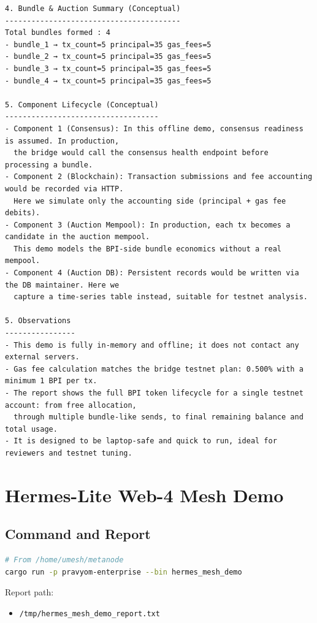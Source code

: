\begin{lstlisting}[language=text]
4. Bundle & Auction Summary (Conceptual)
----------------------------------------
Total bundles formed : 4
- bundle_1 → tx_count=5 principal=35 gas_fees=5
- bundle_2 → tx_count=5 principal=35 gas_fees=5
- bundle_3 → tx_count=5 principal=35 gas_fees=5
- bundle_4 → tx_count=5 principal=35 gas_fees=5

5. Component Lifecycle (Conceptual)
-----------------------------------
- Component 1 (Consensus): In this offline demo, consensus readiness is assumed. In production,
  the bridge would call the consensus health endpoint before processing a bundle.
- Component 2 (Blockchain): Transaction submissions and fee accounting would be recorded via HTTP.
  Here we simulate only the accounting side (principal + gas fee debits).
- Component 3 (Auction Mempool): In production, each tx becomes a candidate in the auction mempool.
  This demo models the BPI-side bundle economics without a real mempool.
- Component 4 (Auction DB): Persistent records would be written via the DB maintainer. Here we
  capture a time-series table instead, suitable for testnet analysis.

5. Observations
----------------
- This demo is fully in-memory and offline; it does not contact any external servers.
- Gas fee calculation matches the bridge testnet plan: 0.500% with a minimum 1 BPI per tx.
- The report shows the full BPI token lifecycle for a single testnet account: from free allocation,
  through multiple bundle-like sends, to final remaining balance and total usage.
- It is designed to be laptop-safe and quick to run, ideal for reviewers and testnet tuning.
\end{lstlisting}

\section{Hermes-Lite Web-4 Mesh Demo}

\subsection{Command and Report}

\begin{lstlisting}[language=bash]
# From /home/umesh/metanode
cargo run -p pravyom-enterprise --bin hermes_mesh_demo
\end{lstlisting}

Report path:

\begin{itemize}
  \item \texttt{/tmp/hermes_mesh_demo_report.txt}
\end{itemize}

